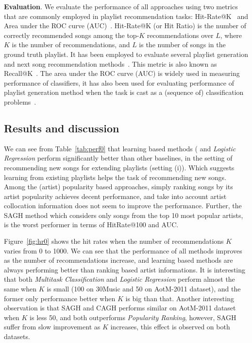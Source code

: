 {\bf Evaluation}.
We evaluate the performance of all approaches using two metrics that are commonly employed in playlist recommendation tasks:
Hit-Rate@K~\cite{hariri2012context} and Area under the ROC curve (AUC)~\cite{manning2008introIR}.
%
%
Hit-Rate@K (or Hit Ratio) is the number of correctly recommended songs among the top-$K$ recommendations over $L$,
where $K$ is the number of recommendations, and $L$ is the number of songs in the ground truth playlist.
It has been employed to evaluate several playlist generation and next song recommendation
methods~\cite{hariri2012context,bonnin2013evaluating,bonnin2015automated,jannach2015beyond}.
This metric is also known as Recall@K~\cite{schedl2017}.
%
The area under the ROC curve (AUC) is widely used in measuring performance of classifiers,
it has also been used for evaluating performance of playlist generation method when the task
is cast as a (sequence of) classification problems~\cite{ben2017groove}.


\subsection{Results and discussion}

We can see from Table~\ref{tab:perf0} that learning based methods (
and {\it Logistic Regression} perform significantly better than other baselines, in the setting of
recommending new songs for extending playlists (setting (i)).
Which suggests learning from existing playlists helps the task of recommending new songs.
Among the (artist) popularity based approaches, 
simply ranking songs by its artist popularity achieves decent performance,
and take into account artist collocation information does not seem to improve the performance.
Further, the SAGH method which considers only songs from the top 10 most popular artists,
is the worst performer in terms of HitRate@100 and AUC.

Figure~\ref{fig:hr0} shows the hit rates when the number of recommendations $K$ varies from 0 to 1000.
We can see that the performance of all methods improves as the number of recommendations increase,
and learning based methods are always performing better than ranking based artist informations.
It is interesting that both {\it Multitask Classification} and {\it Logistic Regression} perform 
almost the same when $K$ is small (100 on 30Music and 50 on AotM-2011 dataset), 
and the former only performance better when $K$ is big than that.
Another interesting observation is that SAGH and CAGH performs similar on AotM-2011 dataset when $K$
is less 50, and both outperforms {\it Popularity Ranking}, however, SAGH suffer from slow improvement
as $K$ increases, this effect is observed on both datasets.


